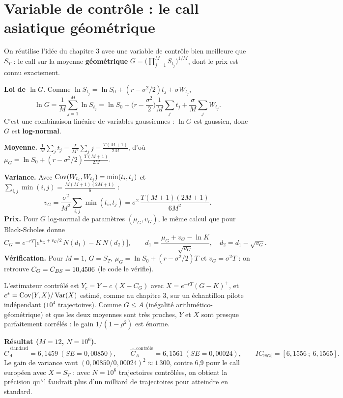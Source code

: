 \section{Variable de contrôle : le call asiatique géométrique}

On réutilise l'idée du chapitre 3 avec une variable de contrôle bien meilleure que $S_T$ : le call sur la moyenne \textbf{géométrique} $G = \big(\prod_{j=1}^M S_{t_j}\big)^{1/M}$, dont le prix est connu exactement.

\begin{demo}
\textbf{Loi de $\ln G$.} Comme $\ln S_{t_j} = \ln S_0 + (r-\sigma^2/2)t_j + \sigma W_{t_j}$,
\[
\ln G = \frac1M\sum_{j=1}^M\ln S_{t_j} = \ln S_0 + \Big(r-\frac{\sigma^2}2\Big)\frac1M\sum_j t_j + \frac{\sigma}{M}\sum_j W_{t_j}.
\]
C'est une combinaison linéaire de variables gaussiennes : $\ln G$ est gaussien, donc $G$ est \textbf{log-normal}.

\textbf{Moyenne.} $\frac1M\sum_j t_j = \frac{T}{M^2}\sum_j j = \frac{T(M+1)}{2M}$, d'où $\mu_G = \ln S_0 + (r-\sigma^2/2)\frac{T(M+1)}{2M}$.

\textbf{Variance.} Avec $\operatorname{Cov}(W_{t_i},W_{t_j}) = \min(t_i,t_j)$ et $\sum_{i,j}\min(i,j) = \frac{M(M+1)(2M+1)}{6}$ :
\[
v_G = \frac{\sigma^2}{M^2}\sum_{i,j}\min(t_i,t_j) = \sigma^2\,\frac{T(M+1)(2M+1)}{6M^2}.
\]
\textbf{Prix.} Pour $G$ log-normal de paramètres $(\mu_G, v_G)$, le même calcul que pour Black-Scholes donne
\[
\boxed{C_G = e^{-rT}\Big[e^{\mu_G+v_G/2}\,N(d_1) - K\,N(d_2)\Big],\qquad d_1 = \frac{\mu_G + v_G - \ln K}{\sqrt{v_G}},\quad d_2 = d_1-\sqrt{v_G}.}
\]
\textbf{Vérification.} Pour $M = 1$, $G = S_T$, $\mu_G = \ln S_0 + (r-\sigma^2/2)T$ et $v_G = \sigma^2T$ : on retrouve $C_G = C_{BS} = 10{,}4506$ (le code le vérifie).
\end{demo}

L'estimateur contrôlé est $Y_c = Y - c\,(X - C_G)$ avec $X = e^{-rT}(G-K)^+$, et $c^* = \operatorname{Cov}(Y,X)/\operatorname{Var}(X)$ estimé, comme au chapitre 3, sur un échantillon pilote indépendant ($10^4$ trajectoires). Comme $G\le A$ (inégalité arithmético-géométrique) et que les deux moyennes sont très proches, $Y$ et $X$ sont presque parfaitement corrélés : le gain $1/(1-\rho^2)$ est énorme.

\textbf{Résultat ($M = 12$, $N = 10^6$).}
\[
\hat C_A^{\,\text{standard}} = 6{,}1459\ (SE = 0{,}00850),\qquad \hat C_A^{\,\text{contrôle}} = 6{,}1561\ (SE = 0{,}00024),\qquad IC_{95\%} = [6{,}1556\ ;\ 6{,}1565].
\]
Le gain de variance vaut $(0{,}00850/0{,}00024)^2\approx1\,300$, contre 6,9 pour le call européen avec $X = S_T$ : avec $N = 10^6$ trajectoires contrôlées, on obtient la précision qu'il faudrait plus d'un milliard de trajectoires pour atteindre en standard.

